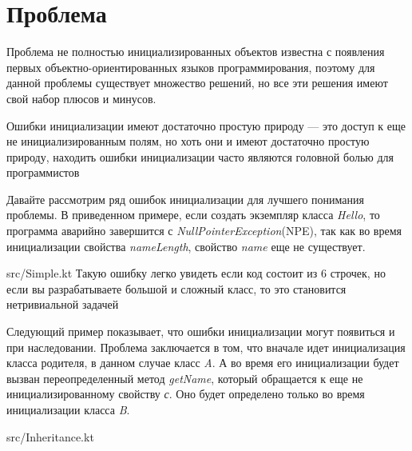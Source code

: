 \chapter{Проблема}\label{ch:проблема-}

Проблема не полностью инициализированных объектов известна с появления первых объектно-ориентированных языков программирования,
поэтому для данной проблемы существует множество решений, но все эти решения имеют свой набор плюсов и минусов.

Ошибки инициализации имеют достаточно простую природу --- это доступ к еще не инициализированным полям,
но хоть они и имеют достаточно простую природу, находить ошибки инициализации часто являются головной болью для программистов

Давайте рассмотрим ряд ошибок инициализации для лучшего понимания проблемы.
В приведенном примере, если создать экземпляр класса \emph{Hello}, то программа аварийно завершится
с \emph{NullPointerException}(NPE),
так как во время инициализации свойства \emph{nameLength}, свойство \emph{name} еще не существует.

{src/Simple.kt}
Такую ошибку легко увидеть если код состоит из 6 строчек, но если вы разрабатываете большой и сложный класс,
то это становится нетривиальной задачей

Следующий пример показывает, что ошибки инициализации могут появиться и при наследовании.
Проблема заключается в том, что вначале идет инициализация класса родителя, в данном случае класс \emph{A}.
А во время его инициализации будет вызван переопределенный метод \emph{getName},
который обращается к еще не инициализированному свойству \emph{с}.
Оно будет определено только во время инициализации класса \emph{B}.

{src/Inheritance.kt}

